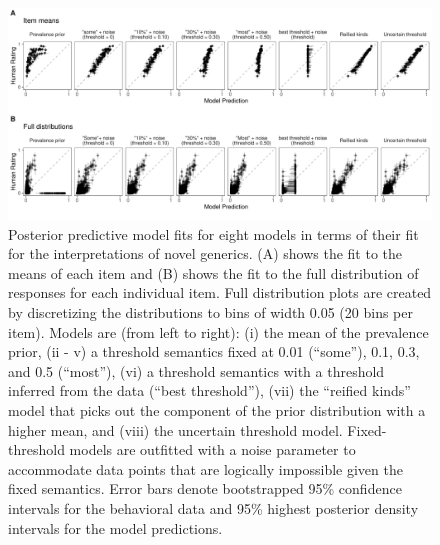 \documentclass[floatsintext,man]{apa6}
\begin{document}
\begin{figure}
\centering
\includegraphics{figs/genint-modelingResults-plotgrid-scatters.pdf}
\caption{\label{fig:genint-modelingResults}Posterior predictive model fits for eight models in terms of their fit for the interpretations of novel generics. (A) shows the fit to the means of each item and (B) shows the fit to the full distribution of responses for each individual item. Full distribution plots are created by discretizing the distributions to bins of width 0.05 (20 bins per item). Models are (from left to right): (i) the mean of the prevalence prior, (ii - v) a threshold semantics fixed at 0.01 (\enquote{some}), 0.1, 0.3, and 0.5 (``most''), (vi) a threshold semantics with a threshold inferred from the data (``best threshold''), (vii) the ``reified kinds'' model that picks out the component of the prior distribution with a higher mean, and (viii) the uncertain threshold model. Fixed-threshold models are outfitted with a noise parameter to accommodate data points that are logically impossible given the fixed semantics. Error bars denote bootstrapped 95\% confidence intervals for the behavioral data and 95\% highest posterior density intervals for the model predictions.}
\end{figure}
\end{document}

